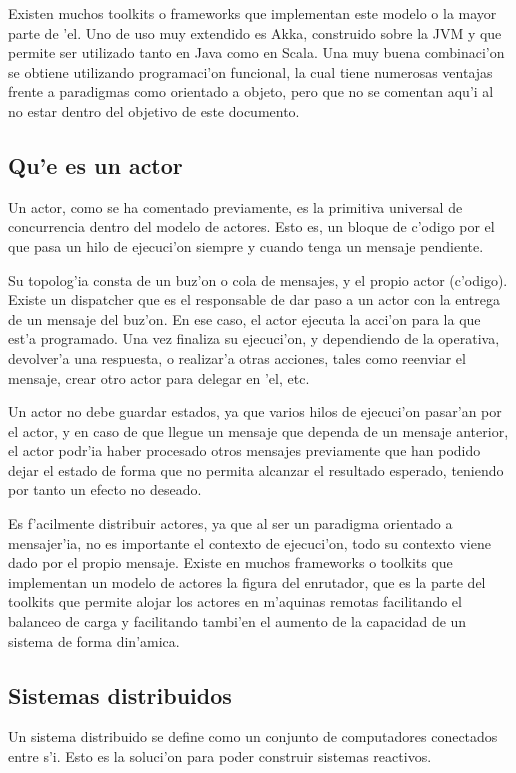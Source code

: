 \documentclass[12pt]{article}
\begin{document}
Existen muchos toolkits o frameworks que implementan este modelo o la mayor parte de 'el. Uno de uso
muy extendido es Akka, construido sobre la JVM y que permite ser utilizado tanto en Java como en Scala.
Una muy buena combinaci'on se obtiene utilizando programaci'on funcional, la cual tiene numerosas
ventajas frente a paradigmas como orientado a objeto, pero que no se comentan aqu'i al no estar
dentro del objetivo de este documento.

\subsection{Qu'e es un actor}
\label{sub:que es un actor}
Un actor, como se ha comentado previamente,  es la primitiva universal de concurrencia
dentro del modelo de actores. Esto es, un bloque de c'odigo por el que pasa un hilo de
ejecuci'on siempre y cuando tenga un mensaje pendiente.

Su topolog'ia consta de un buz'on o cola de mensajes, y el propio actor (c'odigo). Existe un dispatcher
que es el responsable de dar paso a un actor con la entrega de un mensaje del buz'on.
En ese caso, el actor ejecuta la acci'on para la que est'a programado. Una vez finaliza su
ejecuci'on, y dependiendo de la operativa, devolver'a una respuesta, o realizar'a otras acciones,
tales como reenviar el mensaje, crear otro actor para delegar en 'el, etc.

Un actor no debe guardar estados, ya que  varios hilos de ejecuci'on pasar'an por el actor,
y en caso de que llegue un mensaje que dependa de un mensaje anterior, el actor podr'ia haber procesado
 otros mensajes previamente que han podido dejar el estado de forma que no permita alcanzar el resultado
 esperado, teniendo por tanto un efecto no deseado.

Es f'acilmente distribuir actores, ya que al ser un paradigma orientado a mensajer'ia, no es
importante el contexto de ejecuci'on, todo su contexto viene dado por el propio mensaje. Existe en
muchos frameworks o toolkits que implementan un modelo de actores la figura del enrutador, que es
la parte del toolkits que permite alojar los actores en m'aquinas remotas facilitando el balanceo de
carga y facilitando tambi'en el aumento de la capacidad de un sistema de forma din'amica.

\subsection{Sistemas distribuidos}
\label{sub:sistemas distribuidos}
Un sistema distribuido se define como un conjunto de computadores conectados entre s'i. Esto
es la soluci'on para poder construir sistemas reactivos.
\end{document}
